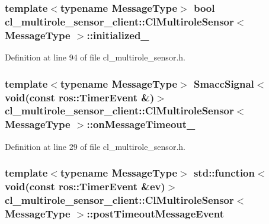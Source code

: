 \subsubsection[{\texorpdfstring{initialized\+\_\+}{initialized_}}]{\setlength{\rightskip}{0pt plus 5cm}template$<$typename Message\+Type$>$ {\bf bool} {\bf cl\+\_\+multirole\+\_\+sensor\+\_\+client\+::\+Cl\+Multirole\+Sensor}$<$ Message\+Type $>$\+::initialized\+\_\+\hspace{0.3cm}{\ttfamily [private]}}\hypertarget{classcl__multirole__sensor__client_1_1ClMultiroleSensor_a799b45e2c2facbeeeefcb635a2311e87}{}\label{classcl__multirole__sensor__client_1_1ClMultiroleSensor_a799b45e2c2facbeeeefcb635a2311e87}


Definition at line 94 of file cl\+\_\+multirole\+\_\+sensor.\+h.

\subsubsection[{\texorpdfstring{on\+Message\+Timeout\+\_\+}{onMessageTimeout_}}]{\setlength{\rightskip}{0pt plus 5cm}template$<$typename Message\+Type$>$ {\bf Smacc\+Signal}$<$void(const ros\+::\+Timer\+Event \&)$>$ {\bf cl\+\_\+multirole\+\_\+sensor\+\_\+client\+::\+Cl\+Multirole\+Sensor}$<$ Message\+Type $>$\+::on\+Message\+Timeout\+\_\+}\hypertarget{classcl__multirole__sensor__client_1_1ClMultiroleSensor_ae9764141a33050c31ccae7f6f2ce3c40}{}\label{classcl__multirole__sensor__client_1_1ClMultiroleSensor_ae9764141a33050c31ccae7f6f2ce3c40}


Definition at line 29 of file cl\+\_\+multirole\+\_\+sensor.\+h.

\subsubsection[{\texorpdfstring{post\+Timeout\+Message\+Event}{postTimeoutMessageEvent}}]{\setlength{\rightskip}{0pt plus 5cm}template$<$typename Message\+Type$>$ std\+::function$<$void(const ros\+::\+Timer\+Event \&ev)$>$ {\bf cl\+\_\+multirole\+\_\+sensor\+\_\+client\+::\+Cl\+Multirole\+Sensor}$<$ Message\+Type $>$\+::post\+Timeout\+Message\+Event}\hypertarget{classcl__multirole__sensor__client_1_1ClMultiroleSensor_ab1f2c8dbe68f3d334385bb7f5503a730}{}\label{classcl__multirole__sensor__client_1_1ClMultiroleSensor_ab1f2c8dbe68f3d334385bb7f5503a730}


